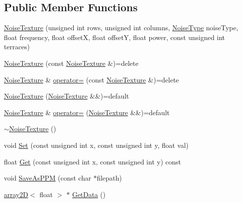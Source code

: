 \subsection*{Public Member Functions}
\begin{DoxyCompactItemize}
\item 
\mbox{\hyperlink{classutl_1_1_noise_texture_ac60ee6e27d57bed1cdc20bacfb4364ee}{Noise\+Texture}} (unsigned int rows, unsigned int columns, \mbox{\hyperlink{namespaceutl_a42b249122648f147a9f518c8661cc8d2}{Noise\+Type}} noise\+Type, float frequency, float offsetX, float offsetY, float power, const unsigned int terraces)
\item 
\mbox{\hyperlink{classutl_1_1_noise_texture_aa64a5aad241c595b8deb5fce6ce9e277}{Noise\+Texture}} (const \mbox{\hyperlink{classutl_1_1_noise_texture}{Noise\+Texture}} \&)=delete
\item 
\mbox{\hyperlink{classutl_1_1_noise_texture}{Noise\+Texture}} \& \mbox{\hyperlink{classutl_1_1_noise_texture_ac571db7b1fe31ecfea09f90967561c2e}{operator=}} (const \mbox{\hyperlink{classutl_1_1_noise_texture}{Noise\+Texture}} \&)=delete
\item 
\mbox{\hyperlink{classutl_1_1_noise_texture_ae3d61cfa25de0be38ebb05113a6e4170}{Noise\+Texture}} (\mbox{\hyperlink{classutl_1_1_noise_texture}{Noise\+Texture}} \&\&)=default
\item 
\mbox{\hyperlink{classutl_1_1_noise_texture}{Noise\+Texture}} \& \mbox{\hyperlink{classutl_1_1_noise_texture_ada8e81c7343b16b7299e368857f22a21}{operator=}} (\mbox{\hyperlink{classutl_1_1_noise_texture}{Noise\+Texture}} \&\&)=default
\item 
\mbox{\hyperlink{classutl_1_1_noise_texture_aaa125a3c7b23512cfbe9c6d5286a4e01}{$\sim$\+Noise\+Texture}} ()
\item 
void \mbox{\hyperlink{classutl_1_1_noise_texture_ae64e6afa2c1a820ffcf18cb781a69022}{Set}} (const unsigned int x, const unsigned int y, float val)
\item 
float \mbox{\hyperlink{classutl_1_1_noise_texture_a757930b6ad17036f81319b74323d5a56}{Get}} (const unsigned int x, const unsigned int y) const
\item 
void \mbox{\hyperlink{classutl_1_1_noise_texture_aa010ee3b9e3373bdbbae4ca20969f3c7}{Save\+As\+P\+PM}} (const char $\ast$filepath)
\item 
\mbox{\hyperlink{classutl_1_1_noise_texture_a68a400f15c53ed50fe2c9bc8f6f1a9c9}{array2D}}$<$ float $>$ $\ast$ \mbox{\hyperlink{classutl_1_1_noise_texture_a0c8bf826ad9ee2010feb513d76a73bda}{Get\+Data}} ()

\end{DoxyCompactItemize}
